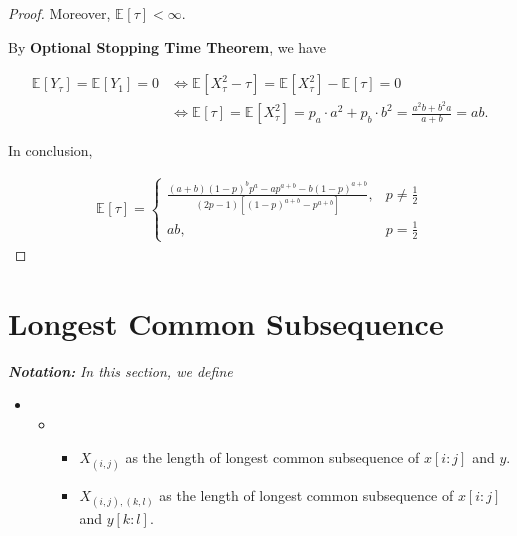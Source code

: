 \documentclass{article}
\newcommand{\staExp}[2]{\mathbb{E}_{#1}\left[#2\right]}
\begin{document}
\begin{proof}
    \vspace{-1em} \hspace{1.3em}
    Moreover, $\staExp{}{\tau}<\infty.$
    
    \hspace{1.3em}
    By \textbf{Optional Stopping Time Theorem}, we have
    
    \vspace{-3em}
    \begin{align*}
        \staExp{}{Y_\tau}=\staExp{}{Y_1}=0 &\Longleftrightarrow \staExp{}{X_\tau^2-\tau}=\staExp{}{X_\tau^2}-\staExp{}{\tau} = 0 \\
        &\Longleftrightarrow \staExp{}{\tau}=\staExp{}{X_\tau^2} = p_a\cdot a^2 + p_b\cdot b^2 = \frac{a^2b+b^2a}{a+b} = ab.
    \end{align*}
    
    \vspace{2em} \hspace{1.3em}
    In conclusion,
    
    \vspace{-2em}
    \begin{align*}
        \staExp{}{\tau}=\left\{\begin{array}{ll}
            \frac{(a+b)(1-p)^bp^a-ap^{a+b}-b(1-p)^{a+b}}{(2p-1)[(1-p)^{a+b}-p^{a+b}]}, & p\neq\frac{1}{2} \\
            ab, & p=\frac{1}{2}
        \end{array}\right.
    \end{align*}
    
    \vspace{-3.9em}
\end{proof}


\vspace{6em}
\section{Longest Common Subsequence}
\vspace{1em}
\textbf{\textit{Notation:}} \textit{In this section, we define}
    
    \vspace{-0.75em}
    \begin{itemize}
        \item[] \begin{itemize}
            \item[] \begin{itemize}
                \item[\textbullet] $X_{(i,j)}$ as the length of longest common subsequence of $x[i:j]$ and $y$.
                \item[\textbullet] $X_{(i,j),(k,l)}$ as the length of longest common subsequence of $x[i:j]$ and $y[k:l]$.
            \end{itemize}
        \end{itemize}
    \end{itemize}
    
\end{document}
